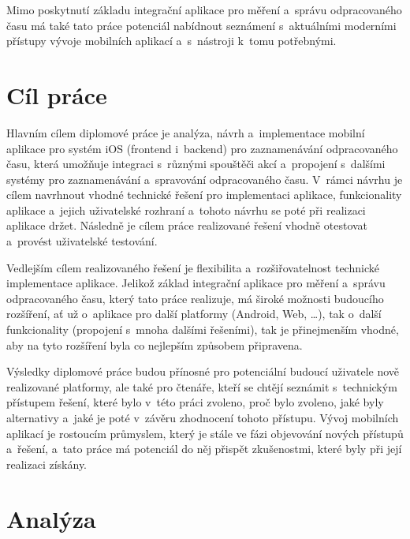 Mimo poskytnutí základu integrační aplikace pro měření a~správu odpracovaného času má také tato práce potenciál nabídnout seznámení s~aktuálními moderními přístupy vývoje mobilních aplikací a~s~nástroji k~tomu potřebnými.

\chapter{Cíl práce}

Hlavním cílem diplomové práce je analýza, návrh a~implementace mobilní aplikace pro systém iOS (frontend i~backend) pro zaznamenávání odpracovaného času, která umožňuje integraci s~různými spouštěči akcí a~propojení s~dalšími systémy pro zaznamenávání a~spravování odpracovaného času. V~rámci návrhu je cílem navrhnout vhodné technické řešení pro implementaci aplikace, funkcionality aplikace a~jejich uživatelské rozhraní a~tohoto návrhu se poté při realizaci aplikace držet. Následně je cílem práce realizované řešení vhodně otestovat a~provést uživatelské testování. 

Vedlejším cílem realizovaného řešení je flexibilita a~rozšiřovatelnost technické implementace aplikace. Jelikož základ integrační aplikace pro měření a~správu odpracovaného času, který tato práce realizuje, má široké možnosti budoucího rozšíření, ať už o~aplikace pro další platformy (Android, Web, \dots), tak o~další funkcionality (propojení s~mnoha dalšími řešeními), tak je přinejmenším vhodné, aby na tyto rozšíření byla co nejlepším způsobem připravena.

Výsledky diplomové práce budou přínosné pro potenciální budoucí uživatele nově realizované platformy, ale také pro čtenáře, kteří se chtějí seznámit s~technickým přístupem řešení, které bylo v~této práci zvoleno, proč bylo zvoleno, jaké byly alternativy a~jaké je poté v~závěru zhodnocení tohoto přístupu. Vývoj mobilních aplikací je rostoucím průmyslem, který je stále ve fázi objevování nových přístupů a~řešení, a~tato práce má potenciál do něj přispět zkušenostmi, které byly při její realizaci získány.

\chapter{Analýza}

